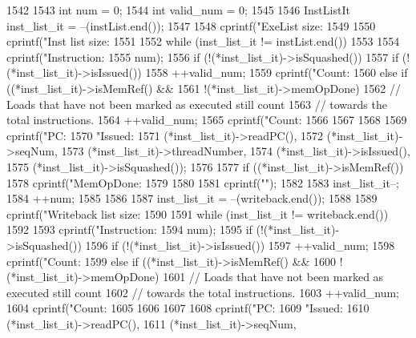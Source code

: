 \begin{DoxyCode}
1542 {
1543     int num = 0;
1544     int valid_num = 0;
1545 
1546     InstListIt inst_list_it = --(instList.end());
1547 
1548     cprintf("ExeList size: %
1549 
1550     cprintf("Inst list size: %
1551 
1552     while (inst_list_it != instList.end())
1553     {
1554         cprintf("Instruction:%
1555                 num);
1556         if (!(*inst_list_it)->isSquashed()) {
1557             if (!(*inst_list_it)->isIssued()) {
1558                 ++valid_num;
1559                 cprintf("Count:%
1560             } else if ((*inst_list_it)->isMemRef() &&
1561                        !(*inst_list_it)->memOpDone) {
1562                 // Loads that have not been marked as executed still count
1563                 // towards the total instructions.
1564                 ++valid_num;
1565                 cprintf("Count:%
1566             }
1567         }
1568 
1569         cprintf("PC:%
1570                 "Issued:%
1571                 (*inst_list_it)->readPC(),
1572                 (*inst_list_it)->seqNum,
1573                 (*inst_list_it)->threadNumber,
1574                 (*inst_list_it)->isIssued(),
1575                 (*inst_list_it)->isSquashed());
1576 
1577         if ((*inst_list_it)->isMemRef()) {
1578             cprintf("MemOpDone:%
1579         }
1580 
1581         cprintf("\n");
1582 
1583         inst_list_it--;
1584         ++num;
1585     }
1586 
1587     inst_list_it = --(writeback.end());
1588 
1589     cprintf("Writeback list size: %
1590 
1591     while (inst_list_it != writeback.end())
1592     {
1593         cprintf("Instruction:%
1594                 num);
1595         if (!(*inst_list_it)->isSquashed()) {
1596             if (!(*inst_list_it)->isIssued()) {
1597                 ++valid_num;
1598                 cprintf("Count:%
1599             } else if ((*inst_list_it)->isMemRef() &&
1600                        !(*inst_list_it)->memOpDone) {
1601                 // Loads that have not been marked as executed still count
1602                 // towards the total instructions.
1603                 ++valid_num;
1604                 cprintf("Count:%
1605             }
1606         }
1607 
1608         cprintf("PC:%
1609                 "Issued:%
1610                 (*inst_list_it)->readPC(),
1611                 (*inst_list_it)->seqNum,
}}
\end{DoxyCode}
